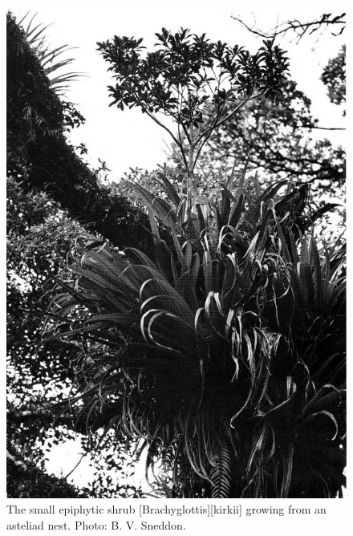 \begin{figure}[htb]
	\centering
	\begin{minipage}[t]{0.487\textwidth}
		\centering
		\includegraphics[width=\textwidth]{graphics/figure44brachyglottis-kirkii.jpg}
    	\caption[The small epiphytic shrub \emph{Brachyglottis kirkii}]{The small epiphytic shrub [Brachyglottis][kirkii] growing from an asteliad nest.
    	Photo: B. V. Sneddon.}%
    	\label{fig:44brachyglottis-kirkii}
	\end{minipage}\hfill%
	\begin{minipage}[t]{0.493\textwidth}
    	\centering

\end{minipage}
\end{figure}
